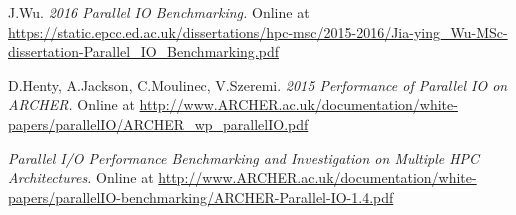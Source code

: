 \documentclass{article}
\begin{document}
\pagebreak
\begin{thebibliography}{100}

 J.Wu. {\em 2016 Parallel IO Benchmarking.} Online at  \url{https://static.epcc.ed.ac.uk/dissertations/hpc-msc/2015-2016/Jia-ying_Wu-MSc-dissertation-Parallel_IO_Benchmarking.pdf}

 D.Henty, A.Jackson, C.Moulinec, V.Szeremi. {\em 2015 Performance of Parallel IO on ARCHER.} Online at \url{http://www.ARCHER.ac.uk/documentation/white-papers/parallelIO/ARCHER_wp_parallelIO.pdf}

 {\em Parallel I/O Performance Benchmarking and Investigation on Multiple HPC Architectures.} Online at \url{http://www.ARCHER.ac.uk/documentation/white-papers/parallelIO-benchmarking/ARCHER-Parallel-IO-1.4.pdf}

\end{thebibliography}
\end{document}
